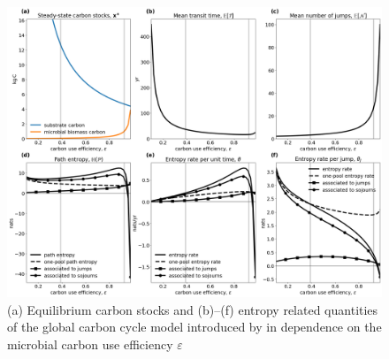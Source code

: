 \documentclass[smallextended]{svjour3}
\makeatletter
\renewcommand*{\eqref}[1]{%
  \hyperref[{#1}]{\textup{\tagform@{\ref*{#1}}}}%
}
\makeatother
\begin{document}
\begin{figure}[htbp]
    \centering
    \includegraphics[width=1.0\linewidth]{figs/Wang_entropies.png}
    \caption{
    (a) Equilibrium carbon stocks and (b)--(f) entropy related quantities of the global carbon cycle model introduced by \citet{Wang2014BG} in dependence on the microbial carbon use efficiency $\varepsilon$
    }
    \label{fig:Wang_entropies}
\end{figure}
\end{document}
